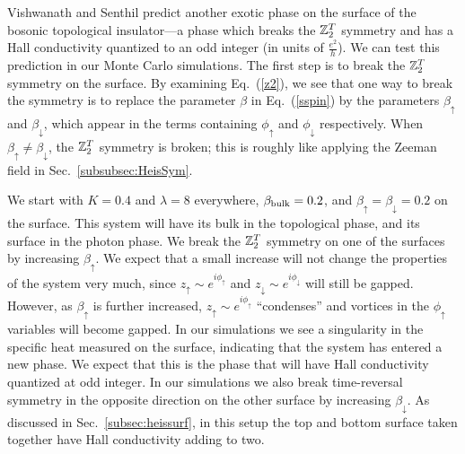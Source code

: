 Vishwanath and Senthil\cite{SenthilVishwanath} predict another exotic phase on the surface of the bosonic topological insulator---a phase which breaks the $\mathbb{Z}_2^T$ symmetry and has a Hall conductivity quantized to an odd integer (in units of $\frac{e^2}{h}$).  We can test this prediction in our Monte Carlo simulations. The first step is to break the $\mathbb{Z}_2^T$ symmetry on the surface. By examining Eq.~(\ref{z2}), we see that one way to break the symmetry is to replace the parameter $\beta$ in Eq.~(\ref{sspin}) by the parameters $\beta_\uparrow$ and $\beta_\downarrow$, which appear in the terms containing $\phi_\uparrow$ and $\phi_\downarrow$ respectively. When $\beta_\uparrow \neq \beta_\downarrow$, the $\mathbb{Z}_2^T$ symmetry is broken; this is roughly like applying the Zeeman field in Sec.~\ref{subsubsec:HeisSym}.

We start with $K=0.4$ and $\lambda=8$ everywhere, $\beta_{\rm bulk}=0.2$, and $\beta_{\uparrow}=\beta_{\downarrow}=0.2$ on the surface. This system will have its bulk in the topological phase, and its surface in the photon phase. We break the $\mathbb{Z}_2^T$ symmetry on one of the surfaces by increasing $\beta_{\uparrow}$. We expect that a small increase will not change the properties of the system very much, since $z_\uparrow\sim e^{i\phi_\uparrow}$ and $z_\downarrow\sim e^{i\phi_\downarrow}$ will still be gapped.\cite{LesikAshvin} However, as $\beta_\uparrow$ is further increased, $z_\uparrow \sim e^{i\phi_\uparrow}$ ``condenses'' and vortices in the $\phi_\uparrow$ variables will become gapped. In our simulations we see a singularity in the specific heat measured on the surface, indicating that the system has entered a new phase. We expect that this is the phase that will have Hall conductivity quantized at odd integer. In our simulations we also break time-reversal symmetry in the opposite direction on the other surface by increasing $\beta_\downarrow$.  As discussed in Sec.~\ref{subsec:heissurf}, in this setup the top and bottom surface taken together have Hall conductivity adding to two.

